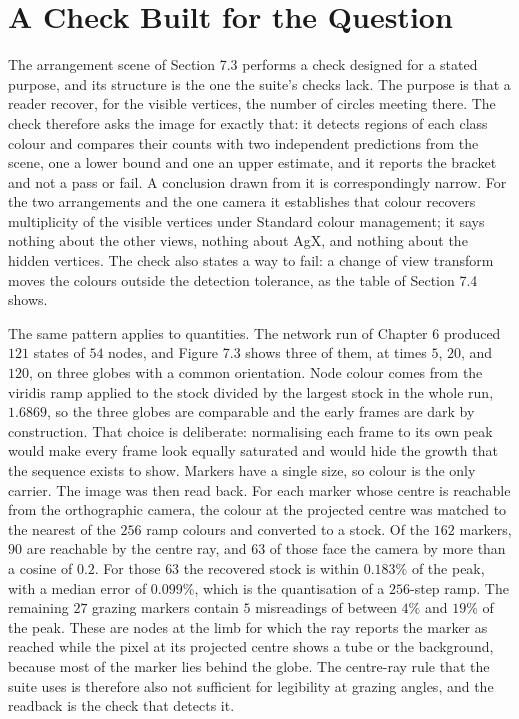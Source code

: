 \section{A Check Built for the Question}

The arrangement scene of Section 7.3 performs a check designed for a stated purpose, and its structure is the one the suite's checks lack. The purpose is that a reader recover, for the visible vertices, the number of circles meeting there. The check therefore asks the image for exactly that: it detects regions of each class colour and compares their counts with two independent predictions from the scene, one a lower bound and one an upper estimate, and it reports the bracket and not a pass or fail. A conclusion drawn from it is correspondingly narrow. For the two arrangements and the one camera it establishes that colour recovers multiplicity of the visible vertices under Standard colour management; it says nothing about the other views, nothing about AgX, and nothing about the hidden vertices. The check also states a way to fail: a change of view transform moves the colours outside the detection tolerance, as the table of Section 7.4 shows.

The same pattern applies to quantities. The network run of Chapter 6 produced $121$ states of $54$ nodes, and Figure 7.3 shows three of them, at times $5$, $20$, and $120$, on three globes with a common orientation. Node colour comes from the viridis ramp applied to the stock divided by the largest stock in the whole run, $1.6869$, so the three globes are comparable and the early frames are dark by construction. That choice is deliberate: normalising each frame to its own peak would make every frame look equally saturated and would hide the growth that the sequence exists to show. Markers have a single size, so colour is the only carrier. The image was then read back. For each marker whose centre is reachable from the orthographic camera, the colour at the projected centre was matched to the nearest of the $256$ ramp colours and converted to a stock. Of the $162$ markers, $90$ are reachable by the centre ray, and $63$ of those face the camera by more than a cosine of $0.2$. For those $63$ the recovered stock is within $0.183\%$ of the peak, with a median error of $0.099\%$, which is the quantisation of a $256$-step ramp. The remaining $27$ grazing markers contain $5$ misreadings of between $4\%$ and $19\%$ of the peak. These are nodes at the limb for which the ray reports the marker as reached while the pixel at its projected centre shows a tube or the background, because most of the marker lies behind the globe. The centre-ray rule that the suite uses is therefore also not sufficient for legibility at grazing angles, and the readback is the check that detects it.

